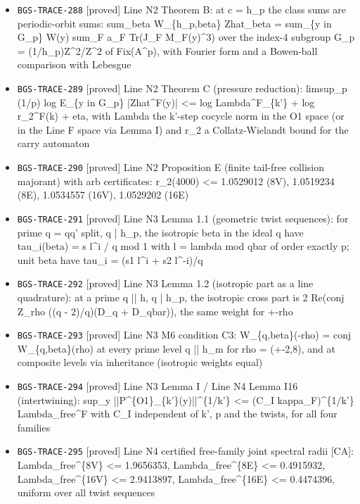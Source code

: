 \begin{itemize}
  \item \texttt{BGS-TRACE-288} [proved] Line N2 Theorem B: at c = h\_p the class sums are periodic-orbit sums: sum\_beta W\_\{h\_p,beta\} Zhat\_beta = sum\_\{y in G\_p\} W(y) sum\_F a\_F Tr(J\_F M\_F(y)\textasciicircum{}3) over the index-4 subgroup G\_p = (1/h\_p)Z\textasciicircum{}2/Z\textasciicircum{}2 of Fix(A\textasciicircum{}p), with Fourier form and a Bowen-ball comparison with Lebesgue
  \item \texttt{BGS-TRACE-289} [proved] Line N2 Theorem C (pressure reduction): limsup\_p (1/p) log E\_\{y in G\_p\} |Zhat\textasciicircum{}F(y)| <= log Lambda\textasciicircum{}F\_\{k'\} + log r\_2\textasciicircum{}F(k) + eta, with Lambda the k'-step cocycle norm in the O1 space (or in the Line F space via Lemma I) and r\_2 a Collatz-Wielandt bound for the carry automaton
  \item \texttt{BGS-TRACE-290} [proved] Line N2 Proposition E (finite tail-free collision majorant) with arb certificates: r\_2(4000) <= 1.0529012 (8V), 1.0519234 (8E), 1.0534557 (16V), 1.0529202 (16E)
  \item \texttt{BGS-TRACE-291} [proved] Line N3 Lemma 1.1 (geometric twist sequences): for prime q = qq' split, q | h\_p, the isotropic beta in the ideal q have tau\_i(beta) = s l\textasciicircum{}i / q mod 1 with l = lambda mod qbar of order exactly p; unit beta have tau\_i = (s1 l\textasciicircum{}i + s2 l\textasciicircum{}-i)/q
  \item \texttt{BGS-TRACE-292} [proved] Line N3 Lemma 1.2 (isotropic part as a line quadrature): at a prime q || h, q | h\_p, the isotropic cross part is 2 Re(conj Z\_rho ((q - 2)/q)(D\_q + D\_qbar)), the same weight for +-rho
  \item \texttt{BGS-TRACE-293} [proved] Line N3 M6 condition C3: W\_\{q,beta\}(-rho) = conj W\_\{q,beta\}(rho) at every prime level q || h\_m for rho = (+-2,8), and at composite levels via inheritance (isotropic weights equal)
  \item \texttt{BGS-TRACE-294} [proved] Line N3 Lemma I / Line N4 Lemma I16 (intertwining): sup\_y ||P\textasciicircum{}\{O1\}\_\{k'\}(y)||\textasciicircum{}\{1/k'\} <= (C\_I kappa\_F)\textasciicircum{}\{1/k'\} Lambda\_free\textasciicircum{}F with C\_I independent of k', p and the twists, for all four families
  \item \texttt{BGS-TRACE-295} [proved] Line N4 certified free-family joint spectral radii [CA]: Lambda\_free\textasciicircum{}\{8V\} <= 1.9656353, Lambda\_free\textasciicircum{}\{8E\} <= 0.4915932, Lambda\_free\textasciicircum{}\{16V\} <= 2.9413897, Lambda\_free\textasciicircum{}\{16E\} <= 0.4474396, uniform over all twist sequences

\end{itemize}
